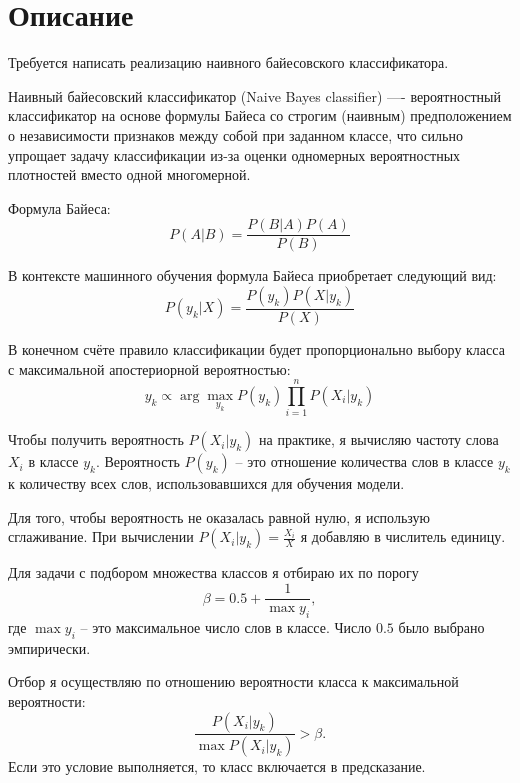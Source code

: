 \section{Описание}
Требуется написать реализацию наивного байесовского классификатора.

Наивный байесовский классификатор (Naive Bayes classifier) —- вероятностный классификатор на основе формулы Байеса 
со строгим (наивным) предположением о независимости признаков между собой при заданном классе, 
что сильно упрощает задачу классификации из-за оценки одномерных вероятностных плотностей вместо одной многомерной\cite{Habr}.

Формула Байеса: $$P(A | B) = \frac{P(B | A) P(A)}{P(B)}$$

В контексте машинного обучения формула Байеса приобретает следующий вид: $$P(y_k | X) = \frac{P(y_k) P(X | y_k)}{P(X)}$$

В конечном счёте правило классификации будет пропорционально выбору класса с максимальной апостериорной вероятностью:
$$y_k \propto \arg \max_{y_k} P(y_k) \prod^n_{i = 1} P(X_i | y_k)$$

Чтобы получить вероятность $P(X_i | y_k)$ на практике, я вычисляю частоту слова $X_i$ в классе $y_k$.
Вероятность $P(y_k)$ -- это отношение количества слов в классе $y_k$ к количеству всех слов, использовавшихся для
обучения модели.

Для того, чтобы вероятность не оказалась равной нулю, я использую сглаживание. При вычислении $P(X_i | y_k) = \frac{X_i}{X}$
я добавляю в числитель единицу.

Для задачи с подбором множества классов я отбираю их по порогу $$\beta = 0.5 + \frac{1}{\max y_i},$$ где
$\max y_i$ -- это максимальное число слов в классе. Число $0.5$ было выбрано эмпирически.

Отбор я осуществляю по отношению вероятности класса к максимальной вероятности:
$$\frac{P(X_i | y_k)}{\max P(X_i | y_k)} > \beta.$$ Если это условие выполняется, то класс включается в предсказание.

\pagebreak


